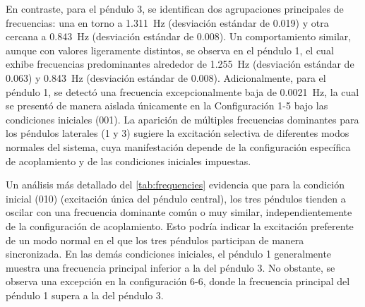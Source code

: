 En contraste, para el p\'endulo 3, se identifican dos agrupaciones
principales de frecuencias: una en torno a \qty{1.311}{\Hz}
(desviaci\'on est\'andar de \num{0.019}) y otra cercana a
\qty{0.843}{\Hz} (desviaci\'on est\'andar de \num{0.008}). Un
comportamiento similar, aunque con valores ligeramente distintos, se
observa en el p\'endulo 1, el cual exhibe frecuencias predominantes
alrededor de \qty{1.255}{\Hz} (desviaci\'on est\'andar de \num{0.063})
y \qty{0.843}{\Hz} (desviaci\'on est\'andar de \num{0.008}).
Adicionalmente, para el p\'endulo 1, se detect\'o una frecuencia
excepcionalmente baja de \qty{0.0021}{\Hz}, la cual se present\'o
de manera aislada \'unicamente en la Configuraci\'on 1-5 bajo las
condiciones iniciales (001). La aparici\'on de m\'ultiples
frecuencias dominantes para los p\'endulos laterales (1 y 3)
sugiere la excitaci\'on selectiva de diferentes modos normales del
sistema, cuya manifestaci\'on depende de la configuraci\'on
espec\'ifica de acoplamiento y de las condiciones iniciales
impuestas.

Un an\'alisis m\'as detallado del \cref{tab:frequencies} evidencia
que para la condici\'on inicial (010) (excitaci\'on \'unica del
p\'endulo central), los tres p\'endulos tienden a oscilar con una
frecuencia dominante com\'un o muy similar, independientemente de la
configuraci\'on de acoplamiento. Esto podr\'ia indicar la
excitaci\'on preferente de un modo normal en el que los tres
p\'endulos participan de manera sincronizada. En las dem\'as
condiciones iniciales, el p\'endulo 1 generalmente muestra una
frecuencia principal inferior a la del p\'endulo 3. No obstante,
se observa una excepci\'on en la configuraci\'on 6-6, donde la
frecuencia principal del p\'endulo 1 supera a la del p\'endulo 3.

